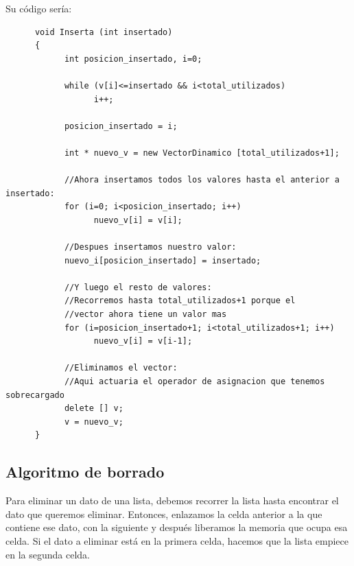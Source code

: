 \documentclass[10pt,a4paper,spanish]{report}
\begin{document}
                  \noindent
                  Su código sería:
      \begin{verbatim}
      void Inserta (int insertado)
      {
            int posicion_insertado, i=0;

            while (v[i]<=insertado && i<total_utilizados)
                  i++;

            posicion_insertado = i;

            int * nuevo_v = new VectorDinamico [total_utilizados+1];

            //Ahora insertamos todos los valores hasta el anterior a insertado:
            for (i=0; i<posicion_insertado; i++)
                  nuevo_v[i] = v[i];

            //Despues insertamos nuestro valor:
            nuevo_i[posicion_insertado] = insertado;

            //Y luego el resto de valores:
            //Recorremos hasta total_utilizados+1 porque el
            //vector ahora tiene un valor mas
            for (i=posicion_insertado+1; i<total_utilizados+1; i++)
                  nuevo_v[i] = v[i-1];

            //Eliminamos el vector:
            //Aqui actuaria el operador de asignacion que tenemos sobrecargado
            delete [] v;
            v = nuevo_v;
      }
      \end{verbatim}
            \subsection{\textcolor[rgb]{0.5,0.8,0.1}Algoritmo de borrado}
            \noindent
                  Para eliminar un dato de una lista, debemos recorrer la lista hasta encontrar el dato que queremos eliminar. Entonces, enlazamos la celda anterior a la que contiene ese dato, con la siguiente y después liberamos la memoria que ocupa esa celda. Si el dato a eliminar está en la primera celda, hacemos que la lista empiece en la segunda celda.
\end{document}
